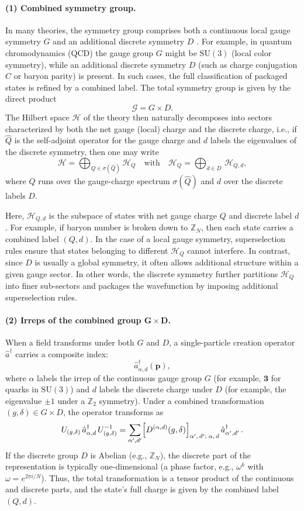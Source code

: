 \documentclass[12pt,a4paper]{article}
\begin{document}
\paragraph{(1) Combined symmetry group.}
In many theories, the symmetry group comprises both a continuous local gauge symmetry $G$ and an additional discrete symmetry $D$ \cite{KraussWilczek1989,IbanezRoss1992,BanksDine1992}.
For example, in quantum chromodynamics (QCD) the gauge group $G$ might be $\mathrm{SU}(3)$ (local color symmetry), while an additional discrete symmetry $D$ (such as charge conjugation $C$ or baryon parity) is present.
In such cases, the full classification of packaged states is refined by a combined label.
The total symmetry group is given by the direct product
\[
\mathcal{G} = G \times D.
\]
The Hilbert space $\mathcal{H}$ of the theory then naturally decomposes into sectors characterized by both the net gauge (local) charge and the discrete charge,
i.e., if $\hat{Q}$ is the self-adjoint operator for the gauge charge and $d$ labels the eigenvalues of the discrete symmetry, then one may write
\[
\mathcal{H} = \bigoplus_{Q\in \sigma(\hat{Q})} \mathcal{H}_Q \quad \text{with} \quad \mathcal{H}_Q = \bigoplus_{d\in D}\, \mathcal{H}_{Q,d},
\]
where $Q$ runs over the gauge-charge spectrum $\sigma(\hat Q)$ and $d$ over the discrete labels $D$.


Here, $\mathcal{H}_{Q,d}$ is the subspace of states with net gauge charge $Q$ and discrete label $d$.
For example, if baryon number is broken down to $\mathbb{Z}_N$, then each state carries a combined label $(Q,d)$.
In the case of a local gauge symmetry, superselection rules ensure that states belonging to different $\mathcal{H}_Q$ cannot interfere.
In contrast, since $D$ is usually a global symmetry, it often allows additional structure within a given gauge sector.
In other words, the discrete symmetry further partitions $\mathcal{H}_Q$ into finer sub-sectors and packages the wavefunction by imposing additional superselection rules.


\paragraph{(2) Irreps of the combined group $\boldsymbol{G \times D}$.}
When a field transforms under both $G$ and $D$, a single-particle creation operator $\hat{a}^\dagger$ carries a composite index:
\[
\hat{a}^\dagger_{\alpha,d}(\mathbf{p}),
\]
where $\alpha$ labels the irrep of the continuous gauge group $G$ (for example, $\mathbf{3}$ for quarks in $\mathrm{SU}(3)$) and $d$ labels the discrete charge under $D$ (for example, the eigenvalue $\pm 1$ under a $\mathbb{Z}_2$ symmetry).
Under a combined transformation $(g,\delta)\in G\times D$, the operator transforms as
\[
U_{(g,\delta)}\,\hat{a}^\dagger_{\alpha,d}\,U_{(g,\delta)}^{-1}
=\sum_{\alpha',d'} \Bigl[D^{(\alpha,d)}(g,\delta)\Bigr]_{\alpha',\,d';\;\alpha,\,d}\,\hat{a}^\dagger_{\alpha',d'}\,.
\]
If the discrete group $D$ is Abelian (e.g., $\mathbb{Z}_N$), the discrete part of the representation is typically one-dimensional (a phase factor, e.g., $\omega^k$ with $\omega=e^{2\pi i/N}$).
Thus, the total transformation is a tensor product of the continuous and discrete parts, and the state's full charge is given by the combined label $(Q,d)$.
\end{document}
